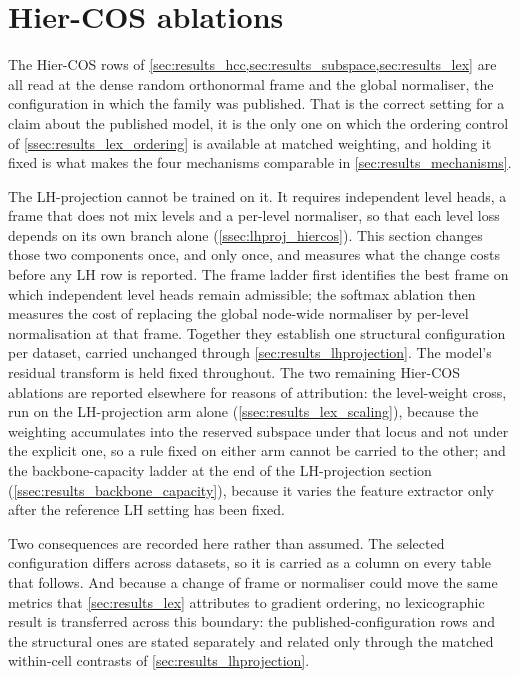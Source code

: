 \section{Hier-COS ablations}
\label{sec:results_substrate}
\label{sec:results_ablations}

The Hier-COS rows of \cref{sec:results_hcc,sec:results_subspace,sec:results_lex}
are all read at the dense random orthonormal frame and the global normaliser, the
configuration in which the family was published. That is the correct setting
for a claim about the published model, it is the only one on which the ordering
control of \cref{ssec:results_lex_ordering} is available at matched weighting,
and holding it fixed is what makes the four mechanisms comparable in
\cref{sec:results_mechanisms}.

The LH-projection cannot be trained on it. It requires independent level heads,
a frame that does not mix levels and a per-level normaliser, so that each level
loss depends on its own branch alone (\cref{ssec:lhproj_hiercos}). This section changes those two
components once, and only once, and measures what the change costs before any LH
row is reported. The frame ladder first identifies the best frame on which
independent level heads remain admissible; the softmax ablation then measures
the cost of replacing the global node-wide normaliser by per-level normalisation
at that frame. Together they establish one structural configuration per dataset,
carried unchanged through \cref{sec:results_lhprojection}. The model's residual
transform is held fixed throughout. The two remaining Hier-COS ablations are
reported elsewhere for reasons of attribution: the level-weight cross, run on the
LH-projection arm alone (\cref{ssec:results_lex_scaling}), because the weighting
accumulates into the reserved subspace under that locus and not under the
explicit one, so a rule fixed on either arm cannot be carried to the other; and
the backbone-capacity ladder at the end of the LH-projection section
(\cref{ssec:results_backbone_capacity}), because it varies the feature extractor
only after the reference LH setting has been fixed.

Two consequences are recorded here rather than assumed. The selected
configuration differs across datasets, so it is carried as a column on every
table that follows. And because a change of frame or normaliser could move the
same metrics that \cref{sec:results_lex} attributes to gradient ordering, no
lexicographic result is transferred across this boundary: the
published-configuration rows and the structural ones are stated separately and
related only through the matched within-cell contrasts of
\cref{sec:results_lhprojection}.

